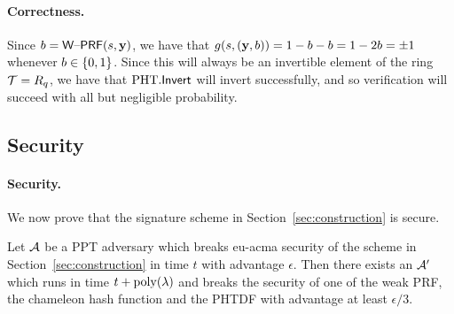 \paragraph{Correctness.} Since $b=\mathsf{W\text{\textendash}PRF}(s,\mathbf{y})$, we have that
$g(s,(\mathbf{y},b))=1-b-b=1-2b=\pm 1$ whenever $b \in \{0,1\}$. Since this will
always be an invertible element of the ring $\mathcal{T}=R_q$, we have that
$\text{PHT}.\mathsf{Invert}$ will invert successfully, and so verification will
succeed with all but negligible probability.


\subsection{Security}
\label{sec:security}

\paragraph{Security.} We now prove that the signature scheme in Section~\ref{sec:construction} is
  secure.
\begin{theorem} Let $\mathcal{A}$ be a PPT adversary which breaks eu-acma
  security of the scheme in Section~\ref{sec:construction} in time $t$
  with advantage $\epsilon$. Then there exists an $\mathcal{A}'$ which runs
  in time $t+\operatorname{poly}(\lambda)$ and breaks the security of one
  of the weak PRF, the chameleon hash function and the PHTDF with
  advantage at least $\epsilon/3$.
\end{theorem} 
